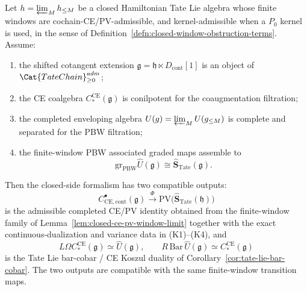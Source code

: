 \begin{lem}
\label{lem:closed-tate-koszul-formalism}
  Let \(\mathfrak h=\varprojlim_M\mathfrak h_{\leq M}\) be a closed
  Hamiltonian Tate Lie algebra whose finite windows are
  cochain-CE/PV-admissible, and kernel-admissible when a \(P_0\) kernel is
  used, in the sense of
  Definition~\ref{defn:closed-window-obstruction-terms}.  Assume:
  \begin{enumerate}[label=(K\arabic*)]
    \item the shifted cotangent extension
      \(\mathfrak g=\mathfrak h\ltimes D_{\mathrm{cont}}[1]\) is an
      object of \(\Cat{TateChain}_{\geq0}^{\mathrm{adm}}\);
    \item the CE coalgebra \(C_*^{\mathrm{CE}}(\mathfrak g)\) is
      conilpotent for the coaugmentation filtration;
    \item the completed enveloping algebra
      \(\widehat U(\mathfrak g)=\varprojlim_M\widehat U(\mathfrak g_{\leq M})\)
      is complete and separated for the PBW filtration;
    \item the finite-window PBW associated graded maps assemble to
      \[
        \mathrm{gr}_{\mathrm{PBW}}\widehat U(\mathfrak g)
          \cong
        \widehat{\mathbf S}_{\mathrm{Tate}}(\mathfrak g).
      \]
  \end{enumerate}
  Then the closed-side formalism has two compatible outputs:
  \[
    C^\bullet_{\mathrm{CE},\mathrm{cont}}(\mathfrak g)
      \xrightarrow{\ \Phi\ }
    \mathrm{PV}\bigl(\widehat{\mathbf S}_{\mathrm{Tate}}(\mathfrak h)\bigr)
  \]
  is the admissible completed CE/PV identity obtained from the
  finite-window family of Lemma~\ref{lem:closed-ce-pv-window-limit}
  together with the exact continuous-dualization and variance data in
  (K1)--(K4), and
  \[
    L\Omega C_*^{\mathrm{CE}}(\mathfrak g)
      \simeq \widehat U(\mathfrak g),\qquad
    R\,\mathrm{Bar}\,\widehat U(\mathfrak g)
      \simeq C_*^{\mathrm{CE}}(\mathfrak g)
  \]
  is the Tate Lie bar-cobar / CE Koszul duality of
  Corollary~\ref{cor:tate-lie-bar-cobar}.  The two outputs are
  compatible with the same finite-window transition maps.
\end{lem}

